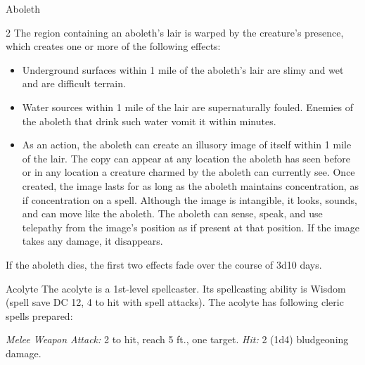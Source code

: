 \documentclass[10pt,a4paper,twoside,bg=print,twocolumn,openany,nodeprecatedcode]{dndbook}
\begin{document}
\begin{DndMonster}[float*=b,width=\textwidth + 8pt]{Aboleth}
\begin{multicols}{2}
The region containing an aboleth's lair is warped by the creature's presence, which creates one or more of the following effects:


\begin{itemize}
\item Underground surfaces within 1 mile of the aboleth's lair are slimy and wet and are difficult terrain.
\item Water sources within 1 mile of the lair are supernaturally fouled. Enemies of the aboleth that drink such water vomit it within minutes.
\item As an action, the aboleth can create an illusory image of itself within 1 mile of the lair. The copy can appear at any location the aboleth has seen before or in any location a creature charmed by the aboleth can currently see. Once created, the image lasts for as long as the aboleth maintains concentration, as if concentration on a spell. Although the image is intangible, it looks, sounds, and can move like the aboleth. The aboleth can sense, speak, and use telepathy from the image's position as if present at that position. If the image takes any damage, it disappears.
\end{itemize}

If the aboleth dies, the first two effects fade over the course of 3d10 days.

\end{multicols}
\end{DndMonster}



\begin{DndMonster}[float=t]{Acolyte}
\DndMonsterBasics[
armor-class = {10},
hit-points = {\DndDice{2d8}},
speed = {30 ft.}
]
\DndMonsterAbilityScores[
 str = 10,
 dex = 10,
 con = 10,
 int = 10,
 wis = 14,
 cha = 11
]
\DndMonsterDetails[
skills = {Medicine +4, Religion +2},
languages = {any one language (usually Common)},
challenge = 1/4,
]
The acolyte is a 1st-level spellcaster. Its spellcasting ability is Wisdom (spell save DC 12, 4 to hit with spell attacks). The acolyte has following cleric spells prepared:
\begin{DndMonsterSpells}
\end{DndMonsterSpells}
\textsl{Melee Weapon Attack:} 2 to hit, reach 5 ft., one target. \textsl{Hit:} 2 (1d4) bludgeoning damage.

\end{DndMonster}
\end{document}
